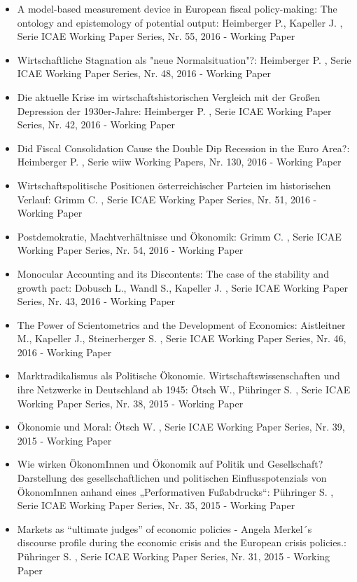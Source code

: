 \begin{itemize}
\item A model-based measurement device in European fiscal policy-making: The ontology and epistemology of potential output: Heimberger P., Kapeller J. , Serie ICAE Working Paper Series, Nr. 55, 2016 - Working Paper
\item Wirtschaftliche Stagnation als "neue Normalsituation"?: Heimberger P. , Serie ICAE Working Paper Series, Nr. 48, 2016 - Working Paper
\item Die aktuelle Krise im wirtschaftshistorischen Vergleich mit der Großen Depression der 1930er-Jahre: Heimberger P. , Serie ICAE Working Paper Series, Nr. 42, 2016 - Working Paper
\item Did Fiscal Consolidation Cause the Double Dip Recession in the Euro Area?: Heimberger P. , Serie wiiw Working Papers, Nr. 130, 2016 - Working Paper
\item Wirtschaftspolitische Positionen österreichischer Parteien im historischen Verlauf: Grimm C. , Serie ICAE Working Paper Series, Nr. 51, 2016 - Working Paper
\item Postdemokratie, Machtverhältnisse und Ökonomik: Grimm C. , Serie ICAE Working Paper Series, Nr. 54, 2016 - Working Paper
\item Monocular Accounting and its Discontents: The case of the stability and growth pact: Dobusch L., Wandl S., Kapeller J. , Serie ICAE Working Paper Series, Nr. 43, 2016 - Working Paper
\item The Power of Scientometrics and the Development of Economics: Aistleitner M., Kapeller J., Steinerberger S. , Serie ICAE Working Paper Series, Nr. 46, 2016 - Working Paper
\item Marktradikalismus als Politische Ökonomie. Wirtschaftswissenschaften und ihre Netzwerke in Deutschland ab 1945: Ötsch W., Pühringer S. , Serie ICAE Working Paper Series, Nr. 38, 2015 - Working Paper
\item Ökonomie und Moral: Ötsch W. , Serie ICAE Working Paper Series, Nr. 39, 2015 - Working Paper
\item Wie wirken ÖkonomInnen und Ökonomik auf Politik und Gesellschaft? Darstellung des gesellschaftlichen und politischen Einflusspotenzials von ÖkonomInnen anhand eines „Performativen Fußabdrucks“: Pühringer S. , Serie ICAE Working Paper Series, Nr. 35, 2015 - Working Paper
\item Markets as “ultimate judges” of economic policies - Angela Merkel´s discourse profile during the economic crisis and the European crisis policies.: Pühringer S. , Serie ICAE Working Paper Series, Nr. 31, 2015 - Working Paper

\end{itemize}
